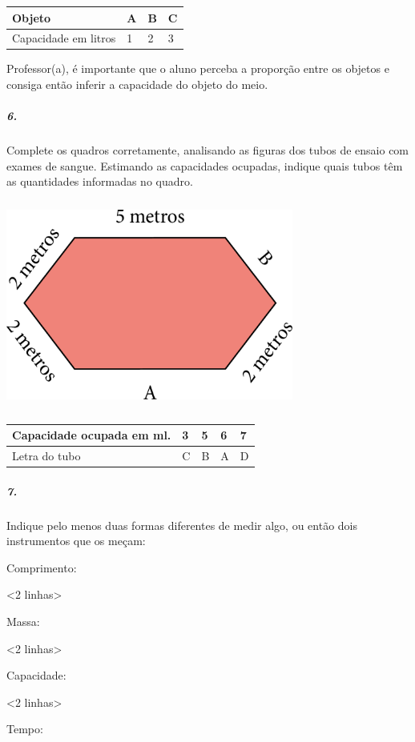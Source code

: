\begin{longtable}[]{@{}llll@{}}
\toprule
Objeto & A & B & C\tabularnewline
\midrule
\endhead
Capacidade em litros & 1 & 2 & 3\tabularnewline
\bottomrule
\end{longtable}

Professor(a), é importante que o aluno perceba a proporção entre os
objetos e consiga então inferir a capacidade do objeto do meio.

\subparagraph{6.}\label{section-33}

Complete os quadros corretamente, analisando as figuras dos tubos de
ensaio com exames de sangue. Estimando as capacidades ocupadas, indique
quais tubos têm as quantidades informadas no quadro.


\includegraphics[width=3.71875in,height=2.70833in]{media/image47.png}

\begin{longtable}[]{@{}lllll@{}}
\toprule
Capacidade ocupada em ml. & 3 & 5 & 6 & 7\tabularnewline
\midrule
\endhead
Letra do tubo & C & B & A & D\tabularnewline
\bottomrule
\end{longtable}

\subparagraph{7.}\label{section-34}

Indique pelo menos duas formas diferentes de medir algo, ou então dois
instrumentos que os meçam:

Comprimento:

\textless{}2 linhas\textgreater{}

Massa:

\textless{}2 linhas\textgreater{}

Capacidade:

\textless{}2 linhas\textgreater{}

Tempo:

